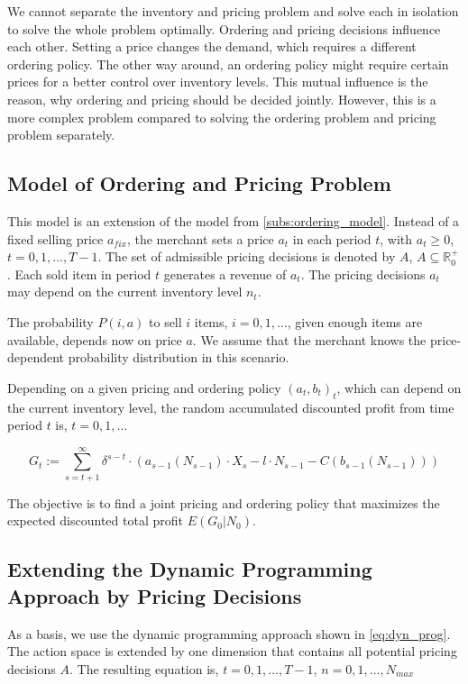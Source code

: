 We cannot separate the inventory and pricing problem and solve each in isolation to solve the whole problem optimally.
Ordering and pricing decisions influence each other.
Setting a price changes the demand, which requires a different ordering policy.
The other way around, an ordering policy might require certain prices for a better control over inventory levels.
This mutual influence is the reason, why ordering and pricing should be decided jointly.
However, this is a more complex problem compared to solving the ordering problem and pricing problem separately.

\subsection{Model of Ordering and Pricing Problem}
\label{subs:joint_model}
This model is an extension of the model from \cref{subs:ordering_model}.
Instead of a fixed selling price $a_{fix}$, the merchant sets a price $a_t$ in each period $t$, with $a_t \geq 0$, $t=0,1,\ldots,T-1$.
The set of admissible pricing decisions is denoted by $A$, $A \subseteq  \mathbb{R}^+_0$.
Each sold item in period $t$ generates a revenue of $a_t$.
The pricing decisions $a_t$ may depend on the current inventory level $n_t$.

The probability $P(i, a)$ to sell $i$ items, $i=0,1,\ldots$, given enough items are available, depends now on price $a$.
We assume that the merchant knows the price-dependent probability distribution in this scenario.

Depending on a given pricing and ordering policy $(a_t, b_t)_t$, which can depend on the current inventory level, the random accumulated discounted profit from time period $t$ is, $t=0,1,\ldots$

$$
G_t := \sum_{s=t+1}^{\infty} \delta^{s-t} \cdot (a_{s-1}(N_{s-1}) \cdot X_s - l \cdot N_{s-1} - C(b_{s-1}(N_{s-1})))
$$

The objective is to find a joint pricing and ordering policy that maximizes the expected discounted total profit $E(G_0 | N_0)$.

\subsection{Extending the Dynamic Programming Approach by Pricing Decisions}
\label{section:joint_solution}
As a basis, we use the dynamic programming approach shown in \cref{eq:dyn_prog}.
The action space is extended by one dimension that contains all potential pricing decisions $A$.
The resulting equation is, $t=0, 1, \ldots,T-1$, $n = 0,1,\ldots,N_{max}$

